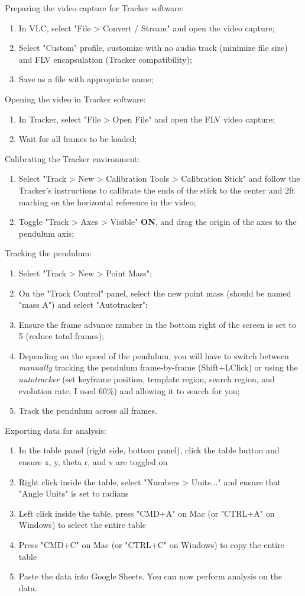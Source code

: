 \documentclass[12pt]{article}
\begin{document}
\noindent
Preparing the video capture for Tracker software:
\begin{enumerate}
    \item In VLC, select "File > Convert / Stream" and open the video capture;
    \item Select "Custom" profile, customize with no audio track (minimize file size) and FLV encapsulation (Tracker compatibility);
    \item Save as a file with appropriate name;
\end{enumerate}
\noindent
Opening the video in Tracker software:
\begin{enumerate}
    \item In Tracker, select "File > Open File" and open the FLV video capture;
    \item Wait for all frames to be loaded;
\end{enumerate}
\pagebreak
\noindent
Calibrating the Tracker environment:
\begin{enumerate}
    \item Select "Track > New > Calibration Tools > Calibration Stick" and follow the Tracker's instructions to calibrate the ends of the stick to the center and 2ft marking on the horizontal reference in the video;
    \item Toggle "Track > Axes > Visible" \textbf{ON}, and drag the origin of the axes to the pendulum axis;
\end{enumerate}
\noindent
Tracking the pendulum:
\begin{enumerate}
    \item Select "Track > New > Point Mass";
    \item On the "Track Control" panel, select the new point mass (should be named "mass A") and select "Autotracker";
    \item Ensure the frame advance number in the bottom right of the screen is set to 5 (reduce total frames);
    \item Depending on the speed of the pendulum, you will have to switch between \emph{manually} tracking the pendulum frame-by-frame (Shift+LClick) or using the \emph{autotracker} (set keyframe position, template region, search region, and evolution rate, I used 60\%) and allowing it to search for you;
    \item Track the pendulum across all frames.
\end{enumerate}
\noindent
Exporting data for analysis:
\begin{enumerate}
    \item In the table panel (right side, bottom panel), click the table button and ensure x, y, theta r, and v are toggled on
    \item Right click inside the table, select "Numbers > Units..." and ensure that "Angle Units" is set to radians
    \item Left click inside the table, press "CMD+A" on Mac (or "CTRL+A" on Windows) to select the entire table
    \item Press "CMD+C" on Mac (or "CTRL+C" on Windows) to copy the entire table
    \item Paste the data into Google Sheets. You can now perform analysis on the data.
\end{enumerate}
\end{document}
